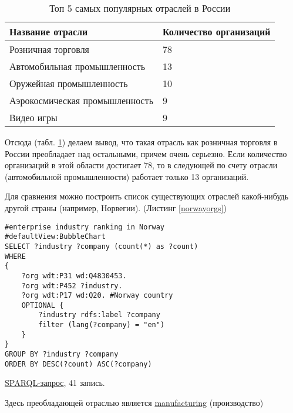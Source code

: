 \begin{table}[h]
\centering
\begin{tabular}{|l|l|}
\hline
\textbf{Название отрасли} & \textbf{Количество организаций} \\
\hline
Розничная торговля & 78 \\
\hline
Автомобильная промышленность & 13 \\	
\hline
Оружейная промышленность & 10 \\
\hline
Аэрокосмическая промышленность & 9 \\
\hline
Видео игры & 9 \\
\hline
\end{tabular}
\caption{Топ 5 самых популярных отраслей в России}
\label{topindustryrus}
\end{table}

Отсюда (табл. \ref{topindustryrus}) делаем вывод, что такая отрасль как розничная торговля в России преобладает над остальными, причем очень серьезно. Если количество организаций в этой области достигает 78, то в следующей по счету отрасли (автомобильной промышленности) работает только 13 организаций.

Для сравнения можно построить список существующих отраслей какой-нибудь другой страны (например, Норвегии). (Листинг \ref{norwayorgs})

\begin{lstlisting}[language=SPARQL,label=norwayorgs,caption=Диаграмма распределения организаций по отраслям в России]
#enterprise industry ranking in Norway
#defaultView:BubbleChart
SELECT ?industry ?company (count(*) as ?count) 
WHERE 
{
    ?org wdt:P31 wd:Q4830453.
    ?org wdt:P452 ?industry.
    ?org wdt:P17 wd:Q20. #Norway country
    OPTIONAL {
		?industry rdfs:label ?company
		filter (lang(?company) = "en")
	}
}
GROUP BY ?industry ?company
ORDER BY DESC(?count) ASC(?company)
\end{lstlisting}

\href{https://query.wikidata.org/#%23enterprise%20industry%20ranking%20in%20Norway%0A%23defaultView%3ABubbleChart%0ASELECT%20%3Findustry%20%3Fcompany%20%28count%28%2a%29%20as%20%3Fcount%29%20%0AWHERE%20%0A%7B%0A%20%20%20%20%3Forg%20wdt%3AP31%20wd%3AQ4830453.%0A%20%20%20%20%3Forg%20wdt%3AP452%20%3Findustry%20.%0A%20%20%20%20%3Forg%20wdt%3AP17%20wd%3AQ20.%20%23Norway%20country%0A%20%20%20%20OPTIONAL%20%7B%0A%09%09%3Findustry%20rdfs%3Alabel%20%3Fcompany%0A%09%09filter%20%28lang%28%3Fcompany%29%20%3D%20%22en%22%29%0A%09%7D%0A%7D%0AGROUP%20BY%20%3Findustry%20%3Fcompany%0AORDER%20BY%20DESC%28%3Fcount%29%20ASC%28%3Fcompany%29%0A}{SPARQL-запрос}, 41 запись.

Здесь преобладающей отраслью является \href{https://www.wikidata.org/wiki/Q187939}{manufacturing} (производство)